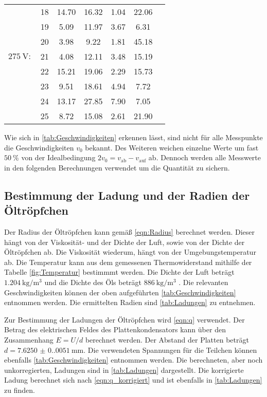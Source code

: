 \begin{table}[H]
\begin{tabular}{c l S[table-format = 2.2] S S S[table-format = 1.2] S[table-format = 2.2]}
        {                   } & {18} & 14.70 & 16.32 & 1.04 & 22.06 \\
        {                   } & {19} &  5.09 & 11.97 & 3.67 &  6.31 \\
        {                   } & {20} &  3.98 &  9.22 & 1.81 & 45.18 \\
        {$\qty{275}{\volt}:$} & {21} &  4.08 & 12.11 & 3.48 & 15.19 \\
        {                   } & {22} & 15.21 & 19.06 & 2.29 & 15.73 \\
        {                   } & {23} &  9.51 & 18.61 & 4.94 &  7.72 \\
        {                   } & {24} & 13.17 & 27.85 & 7.90 &  7.05 \\
        {                   } & {25} &  8.72 & 15.08 & 2.61 & 21.90 \\
      \bottomrule
    \end{tabular}
  \end{table}

Wie sich in \autoref{tab:Geschwindigkeiten} erkennen lässt, sind nicht für alle Messpunkte die Geschwindigkeiten $v_0$ bekannt. Des Weiteren weichen einzelne Werte um fast 
$\qty{50}{\percent}$ von der Idealbedingung $2v_0 = v_\text{ab} - v_\text{auf}$ ab. Dennoch werden alle Messwerte in den folgenden Berechnungen verwendet um die Quantität
zu sichern. 

\subsection{Bestimmung der Ladung und der Radien der Öltröpfchen}
\label{subsec:ladungradius}
Der Radius der Öltröpfchen kann gemäß \autoref{eqn:Radius} berechnet werden. Dieser hängt von der Viskosität-
und der Dichte der Luft, sowie von der Dichte der Öltröpfchen ab. Die Viskosität wiederum, hängt von der Umgebungstemperatur ab. Die Temperatur kann aus dem gemessenen 
Thermowiderstand mithilfe der Tabelle \ref{fig:Temperatur} bestimmmt werden. Die Dichte der Luft beträgt $\qty{1.204}{\kilo\gram\per\cubic\metre}$
und die Dichte des Öls beträgt $\qty{886}{\kilo\gram\per\cubic\metre}$ \cite{v503}. Die relevanten Geschwindigkeiten können der oben aufgeführten \autoref{tab:Geschwindigkeiten}
entnommen werden. Die ermittelten Radien sind \autoref{tab:Ladungen} zu entnehmen. 

Zur Bestimmung der Ladungen der Öltröpfchen wird \autoref{eqn:q} verwendet.
Der Betrag des elektrischen Feldes des Plattenkondensators kann über den Zusammenhang $E = U/d$ berechnet werden. Der Abstand der Platten beträgt $d = \qty{7.6250(0.0051)}{\milli\metre}$.
Die verwendeten Spannungen für die Teilchen können ebenfalls \autoref{tab:Geschwindigkeiten} entnommen werden. Die berechneten,
aber noch unkorregierten, Ladungen sind in \autoref{tab:Ladungen} dargestellt. Die korrigierte Ladung berechnet sich nach \autoref{eqn:q_korrigiert} und ist ebenfalls in
\autoref{tab:Ladungen} zu finden.

